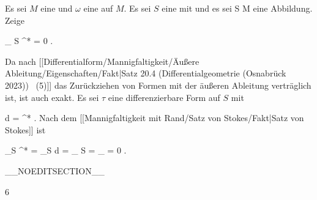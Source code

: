 {

Es sei $M$ eine
und $\omega$ eine
 
auf $M$. Es sei $S$ eine
 {} {}
mit
und es sei
\maabbdisp {\varphi} { S } { M
} {}
eine
Abbildung. Zeige

\mavergleichskettedisp
{\vergleichskette
{
\int_{  S  }   \varphi^*\omega
}
{ =} { 0
}
{ } {
}
{ } {
}
{ } {
}
}
{}{}{.}

}
{

Da nach
[[Differentialform/Mannigfaltigkeit/Äußere Ableitung/Eigenschaften/Fakt|Satz 20.4 (Differentialgeometrie (Osnabrück 2023))  (5)]]
das Zurückziehen von Formen mit der äußeren Ableitung verträglich ist, ist auch
\mathl{\varphi^*\omega}{} exakt. Es sei $\tau$ eine differenzierbare Form auf $S$ mit

\mavergleichskettedisp
{\vergleichskette
{d \tau
}
{ =} { \varphi^* \omega
}
{ } {
}
{ } {
}
{ } {
}
}
{}{}{.}
Nach
dem [[Mannigfaltigkeit mit Rand/Satz von Stokes/Fakt|Satz von Stokes]]
ist

\mavergleichskettedisp
{\vergleichskette
{ \int_S \varphi^* \omega
}
{ =} { \int_S d \tau
}
{ =} { \int_{ \partial S } \tau
}
{ =} { \int_\emptyset \tau
}
{ =} { 0
}
}
{}{}{.}

 }

__NOEDITSECTION__

{6}

